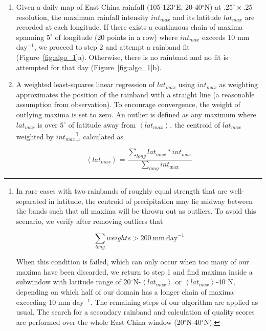 \documentclass[9pt,twocolumn,twoside,lineno]{pnas-new}
\begin{document}
\begin{enumerate}
	\item Given a daily map of East China rainfall (105-123$^{\circ}$E, 20-40$^{\circ}$N) at $.25^{\circ} \times .25^{\circ}$ resolution, the maximum rainfall intensity $int_{max}$ and its latitude $lat_{max}$ are recorded at each longitude. If there exists a continuous chain of maxima spanning $5^{\circ}$ of longitude (20 points in a row) where $int_{max}$ exceeds 10 mm day$^{-1}$, we proceed to step 2 and attempt a rainband fit (Figure~\ref{fig:algo_1}a). Otherwise, there is no rainband and no fit is attempted for that day (Figure~\ref{fig:algo_1}b).
	
	\item A weighted least-squares linear regression of $lat_{max}$ using $int_{max}$ as weighting approximates the position of the rainband with a straight line (a reasonable assumption from observation). To encourage convergence, the weight of outlying maxima is set to zero. An outlier is defined as any maximum where $lat_{max}$ is over $5^{\circ}$ of latitude away from  $\left<lat_{max}\right>$, the centroid of $lat_{max}$ weighted by $int_{max}$\footnote{In rare cases with two rainbands of roughly equal strength that are well-separated in latitude, the centroid of precipitation may lie midway between the bands such that all maxima will be thrown out as outliers. To avoid this scenario, we verify after removing outliers that

	\begin{equation*}
	 \sum\limits_{long} weights > 200 \mathrm{\ mm\ day}^{-1}
	\end{equation*}
	
 	When this condition is failed, which can only occur when too many of our maxima have been discarded, we return to step 1 and find maxima inside a subwindow with latitude range of 20$^{\circ}$N-$\left<lat_{max}\right>$ or $\left<lat_{max}\right>$-40$^{\circ}$N, depending on which half of our domain has a longer chain of maxima exceeding 10 mm day$^{-1}$. The remaining steps of our algorithm are applied as usual. The search for a secondary rainband and calculation of quality scores are performed over the whole East China window (20$^{\circ}$N-40$^{\circ}$N).}, calculated as %

	\begin{equation*}
	\left<lat_{max}\right>=\frac{\sum_{long} lat_{max}*int_{max}}{\sum_{long} int_{\max}}
	\end{equation*}


\end{enumerate}
\end{document}
